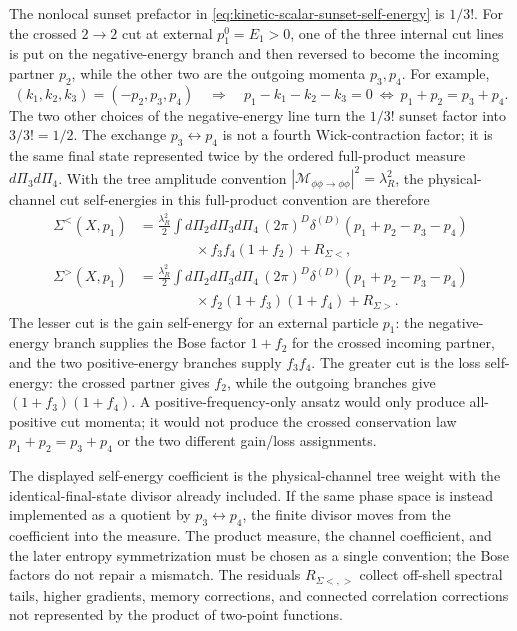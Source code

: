 The nonlocal sunset prefactor in
\eqref{eq:kinetic-scalar-sunset-self-energy} is \(1/3!\).  For the crossed
\(2\to2\) cut at external \(p_1^0=E_1>0\), one of the three internal cut lines
is put on the negative-energy branch and then reversed to become the incoming
partner \(p_2\), while the other two are the outgoing momenta \(p_3,p_4\).
For example,
\[
  (k_1,k_2,k_3)=(-p_2,p_3,p_4)
  \quad\Longrightarrow\quad
  p_1-k_1-k_2-k_3=0
  \ \Longleftrightarrow\
  p_1+p_2=p_3+p_4 .
\]
The two other choices of the negative-energy line turn the \(1/3!\) sunset
factor into \(3/3!=1/2\).  The exchange \(p_3\leftrightarrow p_4\) is not a
fourth Wick-contraction factor; it is the same final state represented twice
by the ordered full-product measure \(d\Pi_3d\Pi_4\).  With the tree amplitude
convention
\(|\mathcal M_{\phi\phi\to\phi\phi}|^2=\lambda_R^2\), the physical-channel
cut self-energies in this full-product convention are therefore
\begin{align}
  \mathcal\Sigma^<(X,p_1)
  &=
  \frac{\lambda_R^2}{2}
  \int d\Pi_2d\Pi_3d\Pi_4\,
  (2\pi)^D\delta^{(D)}(p_1+p_2-p_3-p_4)
  \nonumber\\
  &\qquad\qquad\times
  f_3f_4(1+f_2)+R_{\Sigma<},
  \label{eq:kinetic-scalar-sigma-lesser-cut}\\
  \mathcal\Sigma^>(X,p_1)
  &=
  \frac{\lambda_R^2}{2}
  \int d\Pi_2d\Pi_3d\Pi_4\,
  (2\pi)^D\delta^{(D)}(p_1+p_2-p_3-p_4)
  \nonumber\\
  &\qquad\qquad\times
  f_2(1+f_3)(1+f_4)+R_{\Sigma>}.
  \label{eq:kinetic-scalar-sigma-greater-cut}
\end{align}
The lesser cut is the gain self-energy for an external particle \(p_1\):
the negative-energy branch supplies the Bose factor \(1+f_2\) for the crossed
incoming partner, and the two positive-energy branches supply \(f_3f_4\).
The greater cut is the loss self-energy: the crossed partner gives \(f_2\),
while the outgoing branches give \((1+f_3)(1+f_4)\).  A positive-frequency-only
ansatz would only produce all-positive cut momenta; it would not produce the
crossed conservation law \(p_1+p_2=p_3+p_4\) or the two different gain/loss
assignments.

The displayed self-energy coefficient is the physical-channel tree weight
with the identical-final-state divisor already included.  If the same phase
space is instead implemented as a quotient by \(p_3\leftrightarrow p_4\), the
finite divisor moves from the coefficient into the measure.  The product
measure, the channel coefficient, and the later entropy symmetrization must
be chosen as a single convention; the Bose factors do not repair a mismatch.
The residuals \(R_{\Sigma<,>}\) collect off-shell spectral tails, higher
gradients, memory corrections, and connected correlation corrections not
represented by the product of two-point functions.

